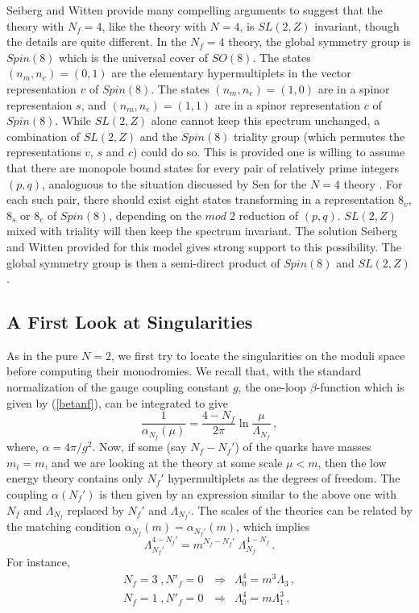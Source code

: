 Seiberg and Witten provide many compelling arguments to suggest that
the theory with $N_f = 4$, like the theory with $N = 4$, is
$SL(2,Z)$ invariant, though the details are quite
different. In the $N_f=4$ theory, the global symmetry group is
$Spin(8)$ which is the universal cover of $SO(8)$. The states $(n_m,
n_e)=(0,1)$ are the elementary hypermultiplets in the vector
representation $v$ of $Spin(8)$.  The states $(n_m, n_e)=(1,0)$ are in
a spinor representaion $s$, and $(n_m, n_e)=(1,1)$ are in a spinor
representation $c$ of $Spin(8)$. While $SL(2,Z)$ alone cannot keep
this spectrum unchanged, a combination of $SL(2,Z)$ and the $Spin(8)$
triality group (which permutes the representations $v$, $s$ and $c$)
could do so. This is provided one is willing to assume that 
there are monopole bound states for every pair of relatively prime
integers $(p,q)$, analoguous to the situation discussed by Sen for the
$N=4$ theory \cite{sen}.  For each such pair, there should exist eight
states transforming in a representation $8_v$, $8_s$ or $8_c$ of
$Spin(8)$, depending on the $mod \; 2$ reduction of $(p,q)$.
$SL(2,Z)$ mixed with triality will then keep the spectrum
invariant. The solution Seiberg and Witten provided for this model
gives strong support to this possibility.  The global symmetry group
is then a semi-direct product of $Spin(8)$ and $SL(2,Z)$.

\subsection{A First Look at Singularities}

As in the pure $N = 2$, we first try to locate the singularities on
the moduli space before computing their monodromies.  We recall that,
with the standard normalization of the gauge coupling constant $g$,
the one-loop $\beta$-function which is given by (\ref{betanf}), can be
integrated to give
$$
\frac{1}{\alpha_{N_f}(\mu)} = \frac{4-N_f}{2 \pi} \ln 
\frac{\mu}{\Lambda_{N_f}}\,,
$$
where, $\alpha=4\pi/g^2$.  Now, if some (say $N_f-N_f'$) of the quarks
have masses $m_i=m$, and we are looking at the theory at some scale
$\mu < m$, then the low energy theory contains only $N_f'$
hypermultiplets as the degrees of freedom. The coupling $\alpha(N_f')$
is then given by an expression similar to the above one with $N_f$ and
$\Lambda_{N_f}$ replaced by $N_f'$ and $\Lambda_{N_f'}$. The scales of
the theories can be related by the matching condition $\alpha_{N_f}(m)
=\alpha_{N_f'}(m)$, which implies
$$
\Lambda^{4-N_f'}_{N_f'} = m^{N_f - N_f'}\;\Lambda_{N_f}^{4-N_f}\,.
$$
For instance,
$$
\begin{array}{lcl}
N_f = 3 \;, N'_f = 0\, &\Rightarrow& \Lambda^{4}_{0} = m^3 \Lambda_3\,,\\
N_f = 1 \;, N'_f = 0\, &\Rightarrow& \Lambda^{4}_{0} = m \Lambda_{1}^{3}\,.
\end{array}
$$

